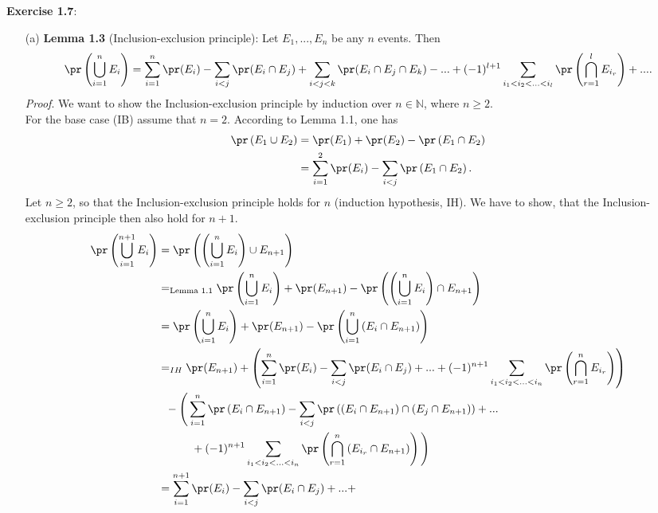 \textbf{Exercise 1.7}:
\begin{enumerate}
  \item[(a)] \textbf{Lemma 1.3} (\textcolor{WildStrawberry}{Inclusion-exclusion
    principle}): Let $E_1,...,E_n$ be any $n$ events. Then
    \[
      \pr\left(\bigcup_{i=1}^n E_i\right)
      = \sum_{i=1}^n \pr(E_i) - \sum_{i<j}\pr(E_i \cap E_j) + \sum_{i<j<k}\pr(E_i \cap E_j \cap E_k) - ... + (-1)^{l+1} \sum_{i_1<i_2< ... <i_l} \pr\left(\bigcap_{r=1}^lE_{i_r}\right)+ ... .
    \]
    \textit{Proof}. We want to show the Inclusion-exclusion principle by induction
    over $n \in \mathbb{N}$, where $n \geq 2$. \\
    For the base case (IB) assume that $n = 2$. According to Lemma 1.1, one has
    \begin{align*}
      \pr\left(E_1 \cup E_2 \right)
        &= \pr(E_1) + \pr(E_2) - \pr\left(E_1 \cap E_2 \right) \\
        &= \sum_{i=1}^2 \pr(E_i) - \sum_{i<j}\pr\left(E_1 \cap E_2 \right).
    \end{align*}
    Let $n \geq 2$, so that the Inclusion-exclusion principle holds for $n$
    (induction hypothesis, IH). We have to show, that the Inclusion-exclusion
    principle then also hold for $n+1$.
    \begin{align*}
      \pr\left(\bigcup_{i=1}^{n+1} E_i\right)
        &= \pr\left(\left(\bigcup_{i=1}^{n} E_i\right) \cup E_{n+1}\right) \\
        &=_{\text{Lemma 1.1}} \pr\left(\bigcup_{i=1}^{n} E_i\right) + \pr(E_{n+1}) -
            \pr\left(\left(\bigcup_{i=1}^{n} E_i\right) \cap E_{n+1}\right) \\
        &= \pr\left(\bigcup_{i=1}^{n} E_i\right) + \pr(E_{n+1}) -
            \pr\left(\bigcup_{i=1}^{n} \left(E_i \cap E_{n+1}\right)\right) \\
        &=_{IH} \pr(E_{n+1}) +
          \left(
            \sum_{i=1}^n \pr(E_i) - \sum_{i<j}\pr(E_i \cap E_j) + ... + (-1)^{n+1}
            \sum_{i_1<i_2< ... <i_n} \pr\left(\bigcap_{r=1}^n E_{i_r}\right)
          \right) \\
        &\ \ - \Bigg(
            \sum_{i=1}^n \pr\left(E_i \cap E_{n+1}\right) -
            \sum_{i<j} \pr\left((E_i \cap E_{n+1}) \cap (E_j \cap E_{n+1})\right)
            + ... \\
        &\quad \quad \quad+ (-1)^{n+1} \sum_{i_1<i_2< ... <i_n} \pr\left(\bigcap_{r=1}^n
            \left(E_{i_r} \cap E_{n+1}\right)\right)
          \Bigg) \\
        &= \sum_{i=1}^{n+1} \pr(E_i) - \sum_{i<j}\pr(E_i \cap E_j) + ... +

\end{align*}
\end{enumerate}
